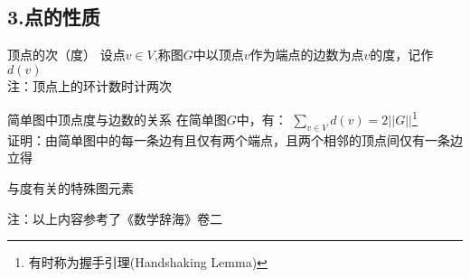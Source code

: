\subsection{3.点的性质}
\begin{definition}{顶点的次（度）}
设点$v \in V$,称图$G$中以顶点$v$作为端点的边数为点$v$的度，记作$d(v)$
\\注：顶点上的环计数时计两次
\end{definition}
\begin{theorem}{简单图中顶点度与边数的关系}
在简单图$G$中，有：
$\sum_{v \in V}{d(v)}=2||G||$\footnote{有时称为握手引理(Handshaking Lemma)}
\\证明：由简单图中的每一条边有且仅有两个端点，且两个相邻的顶点间仅有一条边立得
\end{theorem}
\begin{definition}{与度有关的特殊图元素}

\end{definition}
注：以上内容参考了《数学辞海》卷二